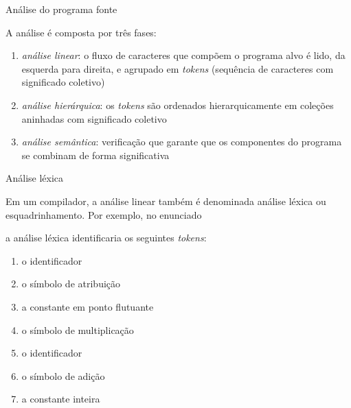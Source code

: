 \begin{frame}[fragile]{Análise do programa fonte}

    A análise é composta por três fases:

    \begin{enumerate}
        \item \textit{análise linear}: o fluxo de caracteres que compõem o programa alvo é lido, da esquerda para direita, e agrupado em \textit{tokens} (sequência
            de caracteres com significado coletivo)

        \item \textit{análise hierárquica}: os \textit{tokens} são ordenados hierarquicamente em coleções aninhadas com significado coletivo

        \item \textit{análise semântica}: verificação que garante que os componentes do programa se combinam de forma significativa
    \end{enumerate}

\end{frame}

\begin{frame}[fragile]{Análise léxica}

    Em um compilador, a análise linear também é denominada análise léxica ou esquadrinhamento.
    Por exemplo, no enunciado
        \begin{center}
        \end{center}
    a análise léxica identificaria os seguintes \textit{tokens}:
    \vspace{0.1in}

    \begin{enumerate}
        \item o identificador 
        \item o símbolo de atribuição 
        \item a constante em ponto flutuante 
        \item o símbolo de multiplicação 
        \item o identificador 
        \item o símbolo de adição 
        \item a constante inteira 
    \end{enumerate}
\end{frame}


